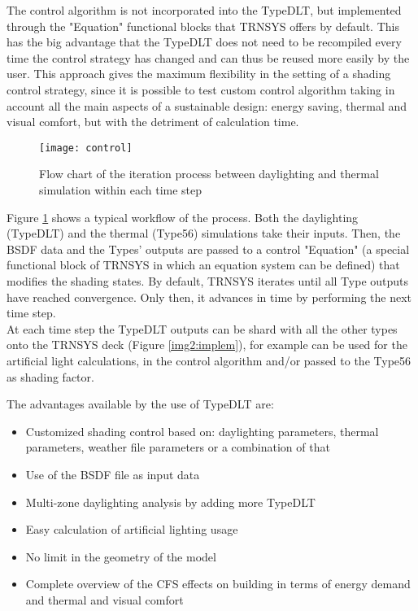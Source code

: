 The control algorithm is not incorporated into the TypeDLT, but implemented through the "Equation" functional blocks that TRNSYS offers by default. This has the big advantage that the TypeDLT does not need to be recompiled every time the control strategy has changed and can thus be reused more easily by the user.
This approach gives the maximum flexibility in the setting of a shading control strategy, since it is possible to test custom control algorithm taking in account all the main aspects of a sustainable design: energy saving, thermal and visual comfort, but with the detriment of calculation time.

\begin{figure}[h]
\centering
\texttt{[image: control]}
\caption{\label{img2:flow} Flow chart of the iteration process between daylighting and thermal simulation within each time step}
\end{figure}

Figure \ref{img2:flow} shows a typical workflow of the process. Both the daylighting (TypeDLT) and the thermal (Type56) simulations take their inputs. Then, the BSDF data and the Types' outputs are passed to a control "Equation" (a special functional block of TRNSYS in which an equation system can be defined) that modifies the shading states. By default, TRNSYS iterates until all Type outputs have reached convergence. Only then, it advances in time by performing the next time step.\\ 
At each time step the TypeDLT outputs can be shard with all the other types onto the TRNSYS deck (Figure \ref{img2:implem}), for example can be used for the artificial light calculations, in the control algorithm and/or passed to the Type56 as shading factor.


The advantages available by the use of TypeDLT are: 
\begin{itemize}
\renewcommand{\labelitemi}{\tiny$\blacksquare$}
\item Customized shading control based on: daylighting parameters, thermal parameters, weather file parameters or a combination of that
\item Use of the BSDF file as input data
\item Multi-zone daylighting analysis by adding more TypeDLT 
\item Easy calculation of artificial lighting usage
\item No limit in the geometry of the model
\item Complete overview of the CFS effects on building in terms of energy demand and thermal and visual comfort
\end{itemize}

